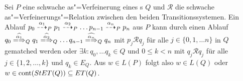 \begin{Lem}[Abläufe in schwachen as"=Verfeinerungen und Spezifikationen]
  \label{AblaefeSchwVerfSpezLem}
  Sei $P$ eine schwache as"=Verfeinerung eines \MEIO{}s $Q$ und $\mathcal{R}$
  die schwache as"=Verfeinerungs"=Relation zwischen den beiden
  Transitionssystemen. Ein Ablauf $p_0 \may[\alpha _1]_P p_1 \may[\alpha _2]_P
  \dots p_{n-1} \may[\alpha _n]_P p_n$ aus $P$ kann durch einen Ablauf $q_0
  \weakmay[\widehat{\alpha _1}]_Q q_1 \weakmay[\widehat{\alpha _2}]_Q \dots
  q_{n-1} \weakmay[\widehat{\alpha _n}]_Q q_n$ mit $p_j \mathcal{R} q_j$ für
  alle $j\in\{0,1,\dots n\}$ in $Q$ gematched werden oder $\exists k: q_0,\dots
  q_k\in Q$ und $0 \leq k < n$ mit $q_j \mathcal{R} q_j$ für alle $j \in
  \{1,2,\dots , k\}$ und $q_k\in E_Q$. Aus $w\in L(P)$ folgt also $w\in L(Q)$
  oder $w\in\mathrm{cont} (StET (Q))\subseteq ET (Q)$.
\end{Lem}
